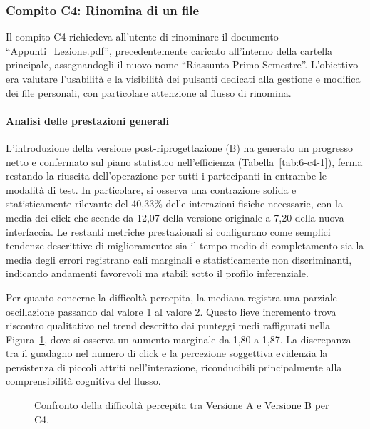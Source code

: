 \subsubsection{Compito C4: Rinomina di un file}

Il compito C4 richiedeva all’utente di rinominare il documento ``Appunti\_Lezione.pdf'', precedentemente caricato all’interno della cartella principale, assegnandogli il nuovo nome ``Riassunto Primo Semestre''. L’obiettivo era valutare l’usabilità e la visibilità dei pulsanti dedicati alla gestione e modifica dei file personali, con particolare attenzione al flusso di rinomina.

\paragraph{Analisi delle prestazioni generali}

L'introduzione della versione post-riprogettazione (B) ha generato un progresso netto e confermato sul piano statistico nell'efficienza (Tabella~\ref{tab:6-c4-1}), ferma restando la riuscita dell'operazione per tutti i partecipanti in entrambe le modalità di test. In particolare, si osserva una contrazione solida e statisticamente rilevante del 40,33\% delle interazioni fisiche necessarie, con la media dei click che scende da 12,07 della versione originale a 7,20 della nuova interfaccia. Le restanti metriche prestazionali si configurano come semplici tendenze descrittive di miglioramento: sia il tempo medio di completamento sia la media degli errori registrano cali marginali e statisticamente non discriminanti, indicando andamenti favorevoli ma stabili sotto il profilo inferenziale.

Per quanto concerne la difficoltà percepita, la mediana registra una parziale oscillazione passando dal valore 1 al valore 2. Questo lieve incremento trova riscontro qualitativo nel trend descritto dai punteggi medi raffigurati nella Figura~\ref{fig:6-c4-1}, dove si osserva un aumento marginale da 1,80 a 1,87. La discrepanza tra il guadagno nel numero di click e la percezione soggettiva evidenzia la persistenza di piccoli attriti nell'interazione, riconducibili principalmente alla comprensibilità cognitiva del flusso.

\begin{figure}[H]
	\centering
	\caption{Confronto della difficoltà percepita tra Versione A e Versione B per C4.}
	\label{fig:6-c4-1}
\end{figure}


